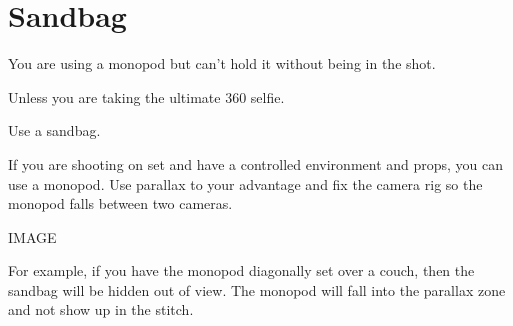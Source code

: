 \chapter{Sandbag}
\pagecolor{white}
\label{chap:12}
\begin{fullwidth}


\problem

{\large You are using a monopod but can’t hold it without being in the shot. \par}

Unless you are taking the ultimate 360 selfie. 

\solution

{\large Use a sandbag.  
 \par}

If you are shooting on set and have a controlled environment and props, you can use a monopod. Use parallax to your advantage and fix the camera rig so the monopod falls between two cameras. 

IMAGE

For example, if you have the monopod diagonally set over a couch, then the sandbag will be hidden out of view. The monopod will fall into the parallax zone and not show up in the stitch. 




\clearpage
\end{fullwidth}
